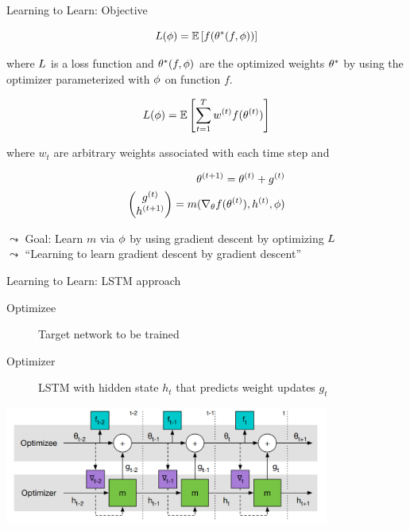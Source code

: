 \begin{frame}[c]{Learning to Learn: Objective }

\vspace{-0.5cm}
\begin{equation}
L(\phi) = \mathbb{E}\left[ f(\theta^*(f,\phi)) \right]\nonumber
\end{equation}

where $L$ is a loss function and $\theta^*(f,\phi)$ are the optimized weights $\theta^*$ by using the optimizer parameterized with $\phi$ on function $f$.

\pause

\begin{equation}
L(\phi) = \mathbb{E}\left[\sum_{t=1}^T w^{(t)} f(\theta^{(t)})\right]\nonumber
\end{equation}

\pause
where $w_t$ are arbitrary weights associated with each time step
and 

\pause
\vspace{-0.5cm}
\begin{eqnarray}
\theta^{(t+1)} = \theta^{(t)} + g^{(t)}\nonumber\\
\begin{pmatrix}g^{(t)}\\h^{(t+1)}\end{pmatrix} = m(\nabla_\theta f(\theta^{(t)}), h^{(t)}, \phi)\nonumber
\end{eqnarray}

\pause
$\leadsto$ Goal: Learn $m$ via $\phi$ by using gradient descent by optimizing $L$ \\
\pause
$\leadsto$ ``Learning to learn gradient descent by gradient descent''
\end{frame}
\begin{frame}[c]{Learning to Learn: LSTM approach }

\begin{description}
\item[Optimizee] Target network to be trained
\item[Optimizer] LSTM with hidden state $h_t$ that predicts weight updates $g_t$
\end{description}

\medskip

\centering
\includegraphics[width=0.8\textwidth]{images/learning_to_learn_lstm}

\end{frame}
